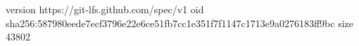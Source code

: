 version https://git-lfs.github.com/spec/v1
oid sha256:587980eede7ecf3796e22e6ce51fb7cc1e351f7f1147c1713e9a0276183ff9bc
size 43802
